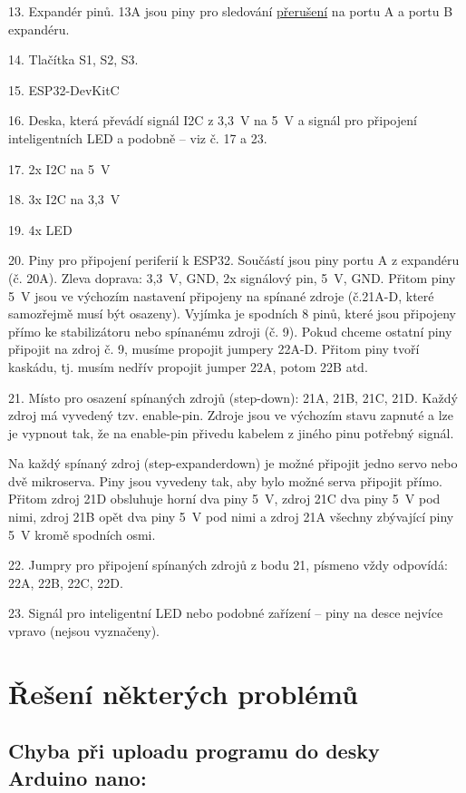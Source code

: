 13. Expandér pinů.
13A jsou piny pro sledování  \hyperref[preruseni]{přerušení}  na portu A a portu B expandéru. 

14. Tlačítka S1, S2, S3. 

15. ESP32-DevKitC

16. Deska, která převádí signál I2C z 3,3~V na 5~V a signál pro připojení inteligentních LED a podobně -- viz č. 17 a 23.

17. 2x I2C na 5~V

18. 3x I2C na 3,3~V

19. 4x LED 

20. Piny pro připojení periferií k ESP32. 
Součástí jsou piny portu A z expandéru (č. 20A). 
Zleva doprava: 3,3~V, GND, 2x signálový pin, 5~V, GND. 
Přitom piny 5~V jsou ve výchozím nastavení připojeny na spínané zdroje (č.21A-D, které samozřejmě musí být osazeny). 
Vyjímka je spodních 8 pinů, které jsou připojeny přímo ke stabilizátoru nebo spínanému zdroji (č. 9). 
Pokud chceme ostatní piny připojit na zdroj č. 9, musíme propojit jumpery 22A-D. 
Přitom piny tvoří kaskádu, tj. musím nedřív propojit jumper 22A, potom 22B atd. 

21. Místo pro osazení spínaných zdrojů (step-down): 21A, 21B, 21C, 21D. 
Každý zdroj má vyvedený tzv. enable-pin. 
Zdroje jsou ve výchozím stavu zapnuté a lze je  vypnout tak, že na enable-pin přivedu kabelem z jiného pinu potřebný signál. 

Na každý spínaný zdroj (step-expanderdown) je možné připojit jedno servo nebo dvě mikroserva. 
Piny jsou vyvedeny tak, aby bylo možné serva připojit přímo. 
Přitom zdroj 21D obsluhuje horní dva piny 5~V, zdroj 21C dva piny 5~V pod nimi, zdroj 21B opět dva piny 5~V pod nimi a zdroj 21A všechny zbývající piny 5~V kromě spodních osmi.


22. Jumpry pro připojení spínaných zdrojů z bodu 21, písmeno vždy odpovídá: 22A, 22B, 22C, 22D.

23. Signál pro inteligentní LED nebo podobné zařízení -- piny na desce nejvíce vpravo (nejsou vyznačeny).

\section{Řešení některých problémů}

\subsection{Chyba při uploadu programu do desky Arduino nano:}
 
